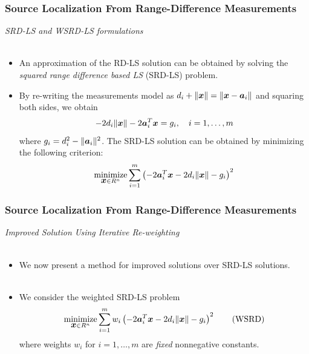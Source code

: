 \documentclass [t] {beamer} %
\begin{document}
\begin{frame} %
\frametitle{Source Localization From Range-Difference Measurements} %
{\large \textit{SRD-LS and WSRD-LS formulations}}
\\~\\
\normalsize
\begin{itemize}
\item 
An approximation of the RD-LS solution can be obtained by solving the \textit{squared range difference based LS} (SRD-LS) problem. \\ %
\item 
By re-writing the measurements model as $d_i+\|\mbox{\boldmath$x$}\|=\|\mbox{\boldmath$x$}-\mbox{\boldmath$a$}_i\|$ and squaring both sides, we obtain
  \begin{equation} 
  \nonumber
-2d_i\|\mbox{\boldmath$x$}\|-2\mbox{\boldmath$a$}_i^T\mbox{\boldmath$x$}=g_i, \quad i=1,\ldots,m
 \end{equation}
 where $g_i=d_i^2-\|\mbox{\boldmath$a$}_i\|^2$.  
The SRD-LS solution can be obtained by minimizing the following criterion:
 \begin{equation}
 \nonumber
\mathop{\mbox{minimize}}_{{\mbox{\boldmath$x$}} \in R^{n}} \sum_{i=1}^m \left(-2\mbox{\boldmath$a$}_i^T\mbox{\boldmath$x$}-2d_i\|\mbox{\boldmath$x$}\|-g_i\right)^2 
\end{equation}

 \end{itemize}
\end{frame}


\begin{frame} %
\frametitle{Source Localization From Range-Difference Measurements} 
{\large \textit{Improved Solution Using Iterative Re-weighting}} \\~\\
\normalsize
\begin{itemize}
\item 
We now present a method for improved solutions over SRD-LS solutions. 
\\~\\
\item 
We consider the weighted SRD-LS problem
\begin{equation} \label{WSRD}
\mathop{\mbox{minimize}}_{{\mbox{\boldmath$x$}} \in R^n} \sum_{i=1}^m w_i\left(-2\mbox{\boldmath$a$}_i^T\mbox{\boldmath$x$}-2d_i\|\mbox{\boldmath$x$}\|-g_i\right)^2 \tag{WSRD}
\end{equation}
where weights $w_i$ for $i=1,\ldots,m$ are \textit{fixed} nonnegative constants. 
\end{itemize}
\end{frame}
\end{document}
